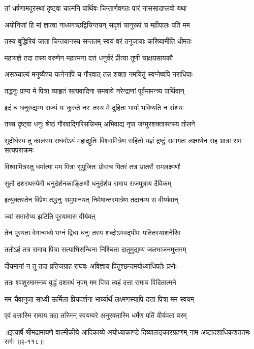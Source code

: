 \twolineshloka
{तां धर्षणामदूरस्थां दृष्ट्वा चात्मनि पार्थिवः}
{चिन्तार्णवगतः पारं नाससादाप्लवो यथा} %

\twolineshloka
{अयोनिजां हि मां ज्ञात्वा नाध्यगच्छद्विचिन्तयन्}
{सदृशं चानुरूपं च महीपालः पतिं मम} %

\twolineshloka
{तस्य बुद्धिरियं जाता चिन्तयानस्य सन्ततम्}
{स्वयं वरं तनूजायाः करिष्यामीति धीमतः} %

\twolineshloka
{महायज्ञे तदा तस्य वरुणेन महात्मना}
{दत्तं धनुर्वरं प्रीत्या तूणी चाक्षयसायकौ} %

\twolineshloka
{असञ्चाल्यं मनुष्यैश्च यत्नेनापि च गौरवात्}
{तन्न शक्ता नमयितुं स्वप्नेष्वपि नराधिपाः} %

\twolineshloka
{तद्धनुः प्राप्य मे पित्रा व्याहृतं सत्यवादिना}
{समवाये नरेन्द्राणां पूर्वमामन्त्र्य पार्थिवान्} %

\twolineshloka
{इदं च धनुरुद्यम्य सज्यं यः कुरुते नरः}
{तस्य मे दुहिता भार्या भविष्यति न संशयः} %

\twolineshloka
{तच्च दृष्ट्वा धनुः श्रेष्ठं गौरवाद्गिरिसन्निभम्}
{अभिवाद्य नृपा जग्मुरशक्तास्तस्य तोलने} %

\threelineshloka
{सुदीर्घस्य तु कालस्य राघवोऽयं महाद्युतिः}
{विश्वामित्रेण सहितो यज्ञं द्रष्टुं समागतः}
{लक्ष्मणेन सह भ्रात्रा रामः सत्यपराक्रमः} %

\twolineshloka
{विश्वामित्रस्तु धर्मात्मा मम पित्रा सुपूजितः}
{प्रोवाच पितरं तत्र भ्रातरौ रामलक्ष्मणौ} %

\twolineshloka
{सुतौ दशरथस्येमौ धनुर्दर्शनकाङ्क्षिणौ}
{धनुर्दर्शय रामाय राजपुत्राय दैविकम्} %

\twolineshloka
{इत्युक्तस्तेन विप्रेण तद्धनुः समुपानयत्}
{निमेषान्तरमात्रेण तदानम्य स वीर्य्यवान्} %

\onelineshloka
{ज्यां समारोप्य झटिति पूरयामास वीर्यवत्} %

\twolineshloka
{तेन पूरयता वेगान्मध्ये भग्नं द्विधा धनुः}
{तस्य शब्दोऽभवद्भीमः पतितस्याशनेरिव} %

\twolineshloka
{ततोऽहं तत्र रामाय पित्रा सत्याभिसन्धिना}
{निश्चिता दातुमुद्यम्य जलभाजनमुत्तमम्} %

\twolineshloka
{दीयमानां न तु तदा प्रतिजग्राह राघवः}
{अविज्ञाय पितुश्छन्दमयोध्याधिपतेः प्रभोः} %

\twolineshloka
{ततः श्वशुरमामन्त्र्य वृद्धं दशरथं नृपम्}
{मम पित्रा त्वहं दत्ता रामाय विदितात्मने} %

\twolineshloka
{मम चैवानुजा साध्वी ऊर्मिला प्रियदर्शना}
{भार्य्यार्थे लक्ष्मणस्यापि दत्ता पित्रा मम स्वयम्} %

\twolineshloka
{एवं दत्तास्मि रामाय तदा तस्मिन् स्वयम्वरे}
{अनुरक्तास्मि धर्मेण पतिं वीर्यवतां वरम्} %


॥इत्यार्षे श्रीमद्रामायणे वाल्मीकीये आदिकाव्ये अयोध्याकाण्डे दिव्यालङ्कारग्रहणम् नाम अष्टादशाधिकशततमः सर्गः ॥२-११८॥
